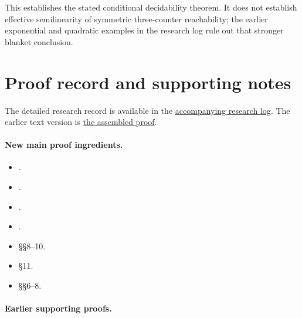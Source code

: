 \documentclass[11pt,a4paper]{article}
\theoremstyle{remark}
\begin{document}
This establishes the stated conditional decidability theorem. It does not establish effective semilinearity of symmetric three-counter reachability; the earlier exponential and quadratic examples in the research log rule out that stronger blanket conclusion.

\section*{Proof record and supporting notes}

The detailed research record is available in the \href{https://chatgpt.com/library?file_id=libfile_f10d80492b688191970c625ab3952096&account_id=personal}{accompanying research log}. The earlier text version is \href{https://chatgpt.com/library?file_id=libfile_7338a158ba3c8191a7b47b1688ce2dd5&account_id=personal}{the assembled proof}.

\paragraph{New main proof ingredients.}

\begin{itemize}[nosep]

\item {}.

\item {}.

\item {}.

\item {}.

\item {} \S\S8--10.

\item {} \S11.

\item {} \S\S6--8.

\end{itemize}

\paragraph{Earlier supporting proofs.}
\end{document}
